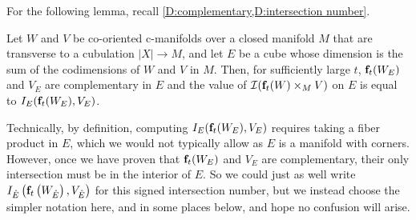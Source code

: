 For the following lemma, recall \cref{D:complementary,D:intersection number}.

\begin{lemma}\label{L:intersection signs}
	Let $W$ and $V$ be co-oriented c-manifolds over a closed manifold $M$ that are transverse to a cubulation $|X| \to M$, and let $E$ be a cube whose dimension
	is the sum of the codimensions of $W$ and $V$ in $M$.
	Then, for sufficiently large $t$, $\mathbf{f}_t(W_E)$ and $V_E$ are complementary in $E$ and the value of $\mathcal{I}(\mathbf{f}_t(W) \times_M V)$ on $E$
	is equal to $I_E(\mathbf{f}_t(W_E), V_E)$.
\end{lemma}
\begin{remark}
	Technically, by definition, computing $I_E(\mathbf{f}_t(W_E), V_E)$ requires taking a fiber product in $E$, which we would not typically allow as $E$ is a manifold with corners.
	However, once we have proven that $\mathbf{f}_t(W_E)$ and $V_E$ are complementary, their only intersection must be in the interior of $E$.
	So we could just as well write $I_{\mathring{E}}\left(\mathbf{f}_t\left(W_{\mathring{E}}\right), V_{\mathring{E}}\right)$ for this signed intersection number, but we instead choose the simpler notation here, and in some places below, and hope no confusion will arise.
\end{remark}
